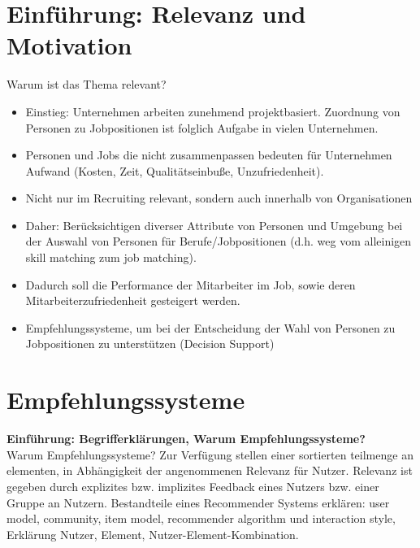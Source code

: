 \newpage

\section{Einführung: Relevanz und Motivation}
\label{ch:notizen:relevanzMotivation}
Warum ist das Thema relevant?
\begin{itemize}
    \item Einstieg: Unternehmen arbeiten zunehmend projektbasiert. Zuordnung von Personen zu Jobpositionen ist folglich Aufgabe in vielen Unternehmen.
    \item Personen und Jobs die nicht zusammenpassen bedeuten für Unternehmen Aufwand (Kosten, Zeit, Qualitätseinbuße, Unzufriedenheit).
    \item Nicht nur im Recruiting relevant, sondern auch innerhalb von Organisationen %
    \item Daher: Berücksichtigen diverser Attribute von Personen und Umgebung bei der Auswahl von Personen für Berufe/Jobpositionen (d.h. weg vom alleinigen skill matching zum job matching).
    \item Dadurch soll die Performance der Mitarbeiter im Job, sowie deren Mitarbeiterzufriedenheit gesteigert werden.
    \item Empfehlungssysteme, um bei der Entscheidung der Wahl von Personen zu Jobpositionen zu unterstützen (Decision Support) %
\end{itemize}

\section{Empfehlungssysteme}
\textbf{Einführung: Begrifferklärungen, Warum Empfehlungssysteme?}\\
Warum Empfehlungssysteme? Zur Verfügung stellen einer sortierten teilmenge an elementen, in Abhängigkeit der angenommenen Relevanz für Nutzer. %
Relevanz ist gegeben durch explizites bzw. implizites Feedback eines Nutzers bzw. einer Gruppe an Nutzern. %
Bestandteile eines Recommender Systems erklären: user model, community, item model, recommender algorithm und interaction style, Erklärung Nutzer, Element, Nutzer-Element-Kombination.\\ %

